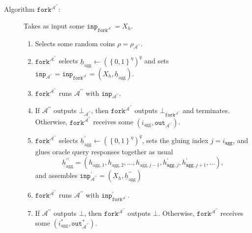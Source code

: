 \documentclass{iacrtrans}
\theoremstyle{definition}
\numberwithin{theorem}{subsection}
\numberwithin{lemma}{theorem}
\newcommand{\adversary}{\mathcal{A}}
\begin{document}
\begin{description}

\item [Algorithm $\texttt{fork}^{\adversary^{\prime \prime}}$:] Takes as input some $\texttt{inp}_{\texttt{fork}^{\adversary^{\prime \prime}}} = X_h$. 
\begin{enumerate}
\item Selects some random coins $\rho = \rho_{\adversary^{\prime \prime}}$.

\item $\texttt{fork}^{\adversary^{\prime \prime}}$  selects $\underline{h}_{\text{agg}} \leftarrow (\left\{0,1\right\}^{\eta})^q$ and sets $\texttt{inp}_{\adversary^{\prime\prime}} = \texttt{inp}_{\texttt{fork}^{\adversary^\prime}} = (X_h,  \underline{h}_{\text{agg}})$.

\item $\texttt{fork}^{\adversary^{\prime \prime}}$ runs $\adversary^{\prime\prime}$ with $\texttt{inp}_{\adversary^{\prime\prime}}$.

\item If $\adversary^{\prime\prime}$ outputs $\bot_{\adversary^{\prime\prime}}$, then  $\texttt{fork}^{\adversary^{\prime \prime}}$ outputs $\bot_{\texttt{fork}^{\adversary^{\prime \prime}}}$ and terminates. Otherwise, $\texttt{fork}^{\adversary^{\prime \prime}}$ receives some $(i_{\text{agg}}, \texttt{out}_{\adversary^{\prime \prime}})$.


\item $\texttt{fork}^{\adversary^{\prime \prime}}$ selects $\underline{h}_{\text{agg}}^{\prime} \leftarrow (\left\{0,1\right\}^\eta)^q$, sets the gluing index $j = i_{\texttt{agg}}$, and glues oracle query responses together as usual \[\underline{h}_{\text{agg}}^{\prime \prime}= (h_{\text{agg},1}, h_{\text{agg},2}, \ldots, h_{\text{agg}, j - 1}, h^{\prime}_{\texttt{agg}, j}, h^{\prime}_{\texttt{agg}, j+1}, \ldots),\] and assembles $\texttt{inp}^{\prime}_{\adversary^{\prime \prime}} = (X_h, \underline{h}_{\text{agg}}^{\prime \prime})$

\item $\texttt{fork}^{\adversary^{\prime \prime}}$ runs $\adversary^{\prime \prime}$ with $\texttt{inp}^{\prime}_{\texttt{fork}^{\adversary^{\prime \prime}}}$.



\item If $\adversary^{\prime \prime}$ outputs $\bot$, then $\texttt{fork}^{\adversary^{\prime \prime}}$ outputs $\bot$. Otherwise, $\texttt{fork}^{\adversary^{\prime \prime}}$ receives some $(i_{\text{agg}}^*, \texttt{out}_{\adversary^{\prime \prime}}^*)$.



\end{enumerate}
\end{description}
\end{document}

